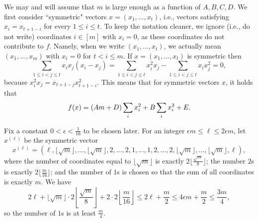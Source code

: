\documentclass[11pt]{article}
\let\oldendproof\endproof
\renewenvironment{proof}[1][\proofname]{%
	\oldproof[\bf #1]%
}{\oldendproof}
\theoremstyle{plain}
\begin{document}
\begin{proof}[Proof of Lemma \ref{general-values-lemma}]
    We may and will assume that $m$ is large enough as a function of $A,B,C,D$. 
    We first consider ``symmetric" vectors $x = (x_1,\dots,x_t)$, i.e., vectors satisfying $x_i = x_{t+1-i}$ for every $1 \leq i \leq t$. 
    To keep the notation cleaner, we ignore (i.e., do not write) coordinates $i \in [m]$ with $x_i = 0$, as these coordinates do not contribute to $f$. Namely, when we write $(x_1,\dots,x_t)$, we actually mean $(x_1,\dots,x_m)$ with $x_i = 0$ for $t < i \leq m$. 
    If $x = (x_1,\dots,x_t)$ is symmetric then 
    $$\sum_{1 \leq i < j \leq t} x_i x_j (x_i - x_j) = 
    \sum_{1 \leq i < j \leq t} x_i^2x_j - \sum_{1 \leq i < j \leq t} x_ix_j^2 = 0,$$ because $x_i^2x_j = x_{t+1-j}x_{t+1-i}^2$. This means that for symmetric vectors $x$, it holds that
    $$
    f(x) = (Am+ \nolinebreak D) \sum_{i} x_i^2 + 
	B \sum_{i} x_i^3 + E.
    $$
    
    
    Fix a constant $0 < \epsilon < \frac{1}{16}$ to be chosen later.
    For an integer $\epsilon m \leq \ell \leq 2\epsilon m$, let $x^{(\ell)}$ be the symmetric vector
    $$x^{(\ell)} = (\ell, \lfloor \sqrt{m} \rfloor, \dots, \lfloor \sqrt{m} \rfloor, 2, \dots, 2, 1, \dots, 1, 2, \dots, 2, \lfloor \sqrt{m} \rfloor, \dots, \lfloor \sqrt{m} \rfloor, \ell),$$ 
    where the number of coordinates equal to $\lfloor \sqrt{m} \rfloor$ is exactly $2 \lfloor \frac{\sqrt{m}}{8} \rfloor$; the number $2$s is exactly $2 \lfloor \frac{m}{16} \rfloor$; and the number of $1$s is chosen so that the sum of all coordinates is exactly $m$. 
    We have 
    $$
    2\ell+ \lfloor \sqrt{m} \rfloor \cdot 
    2 \left\lfloor \frac{\sqrt{m}}{8} \right\rfloor + 
    2 \cdot 2 \left\lfloor \frac{m}{16} \right\rfloor \leq 2\ell + \frac{m}{2} \leq 4\epsilon m + \frac{m}{2} \leq \frac{3m}{4},
    $$
    so the number of $1$s is at least $\frac{m}{4}$. 
    


\end{proof}
\end{document}
